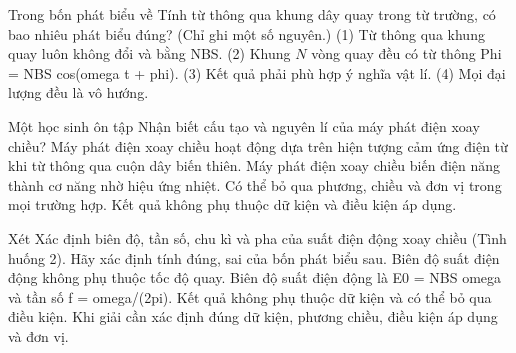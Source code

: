 \begin{ex}
Trong bốn phát biểu về Tính từ thông qua khung dây quay trong từ trường, có bao nhiêu phát biểu đúng? (Chỉ ghi một số nguyên.) (1) Từ thông qua khung quay luôn không đổi và bằng NBS. (2) Khung $N$ vòng quay đều có từ thông Phi = NBS cos(omega t + phi). (3) Kết quả phải phù hợp ý nghĩa vật lí. (4) Mọi đại lượng đều là vô hướng.
\end{ex}

\begin{ex}
Một học sinh ôn tập Nhận biết cấu tạo và nguyên lí của máy phát điện xoay chiều?
\choice
{\True Máy phát điện xoay chiều hoạt động dựa trên hiện tượng cảm ứng điện từ khi từ thông qua cuộn dây biến thiên.}
{Máy phát điện xoay chiều biến điện năng thành cơ năng nhờ hiệu ứng nhiệt.}
{Có thể bỏ qua phương, chiều và đơn vị trong mọi trường hợp.}
{Kết quả không phụ thuộc dữ kiện và điều kiện áp dụng.}
\end{ex}

\begin{ex}
Xét Xác định biên độ, tần số, chu kì và pha của suất điện động xoay chiều (Tình huống 2). Hãy xác định tính đúng, sai của bốn phát biểu sau.
\choiceTF
{Biên độ suất điện động không phụ thuộc tốc độ quay.}
{\True Biên độ suất điện động là E0 = NBS omega và tần số f = omega/(2pi).}
{Kết quả không phụ thuộc dữ kiện và có thể bỏ qua điều kiện.}
{\True Khi giải cần xác định đúng dữ kiện, phương chiều, điều kiện áp dụng và đơn vị.}
\end{ex}

